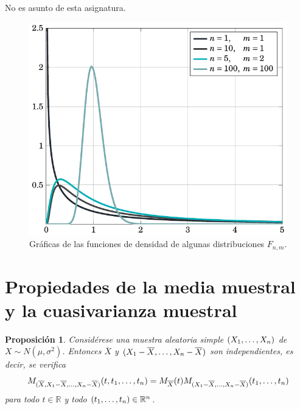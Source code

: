 \documentclass[11pt]{report}
\makeatletter
\renewenvironment{proof}[1][\proofname]{\par
  \pushQED{\qed}%
  \normalfont \topsep\z@skip %
  \trivlist
  \item[\hskip\labelsep
        \itshape
    #1\@addpunct{.}]\ignorespaces
}{%
  \popQED\endtrivlist\@endpefalse
}
\newtheorem{proposition}{Proposición}
\theoremstyle{definition}
\newcommand{\R}{\mathbb R}
\makeatother
\begin{document}
\begin{proof}
    No es asunto de esta asignatura.
\end{proof}

\begin{figure}[H]
    \centering
    \includegraphics{ie_plot_snedecor.pdf}
    \caption{Gráficas de las funciones de densidad de algunas distribuciones $F_{n,m}$.}
\end{figure}

\section{Propiedades de la media muestral y la cuasivarianza muestral}

\begin{proposition}
Considérese una muestra aleatoria simple $(X_1,\mathellipsis,X_n)$ de $X \sim N(\mu,\sigma^2)$. Entonces $\overline{X}$ y $(X_1-\overline{X},\mathellipsis,X_n-\overline{X})$ son independientes, es decir, se verifica
\[M_{(\overline{X},X_1-\overline{X},\mathellipsis,X_n-\overline{X})}(t,t_1,\mathellipsis,t_n) = M_{\overline{X}}(t)M_{(X_1-\overline{X},\mathellipsis,X_n-\overline{X})}(t_1,\mathellipsis,t_n)\]
para todo $t \in \R$ y todo $(t_1,\mathellipsis,t_n) \in \R^n$.
\end{proposition}
\end{document}
